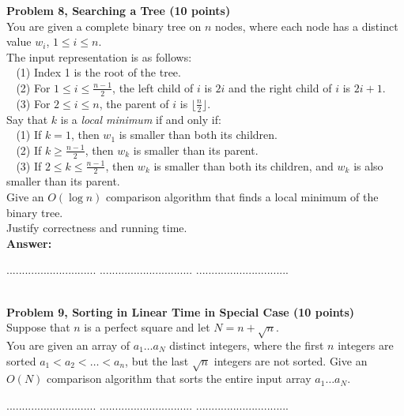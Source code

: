 \documentclass{article}
\begin{document}
\noindent
{\bf Problem 8, Searching a Tree (10 points)}\\
You are given a complete binary tree on $n$ nodes, 
 where each node has a distinct value $w_i$, $1\leq i \leq n$. \\
The input representation is as follows:\\
$~~~~$(1) Index 1 is the root of the tree.\\
$~~~~$(2) For $1\leq i \leq \frac{n-1}{2}$, the left child of $i$ is $2i$ and the right child of $i$ is $2i+1$.\\
$~~~~$(3) For $2\leq i \leq n$, the parent of $i$ is $\lfloor \frac{n}{2} \rfloor$.\\
Say that $k$ is a {\em local minimum}  if and only if:\\
$~~~~$(1) If $k=1$, then $w_1$ is smaller than both its children.\\
$~~~~$(2) If $k\geq \frac{n-1}{2}$, then $w_k$ is smaller than its parent.\\
$~~~~$(3) If $2 \leq k \leq \frac{n-1}{2}$, then $w_k$ is smaller than both its children, and
$w_k$ is also smaller than its parent.\\
Give an $O(\log n)$ comparison algorithm that finds a local minimum of the binary tree.\\
Justify correctness and running time.\\

\noindent
{\bf Answer:}


\pagebreak
{} $.............................$
 $..............................$
          $..............................$

\\


\noindent
{\bf Problem 9,  Sorting in Linear Time in Special Case (10 points)}\\
Suppose that $n$ is a perfect square and let $N=n+\sqrt{n}$.\\
You are given an array of $a_1 \ldots a_N$ distinct integers, where the first $n$ integers are sorted
$a_1 < a_2 < \ldots < a_n$, but the last $\sqrt{n}$ integers are not sorted. 
Give an $O(N)$ comparison algorithm that sorts the entire input array $a_1 \ldots a_N$.\\


\pagebreak
{} $.............................$
 $..............................$
          $..............................$
\end{document}
